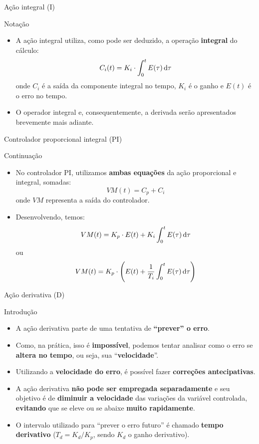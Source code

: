 \begin{frame}{Ação integral (I)}
	\begin{block}{Notação}
		\begin{itemize}
			\item A ação integral utiliza, como pode ser deduzido, a operação \textbf{integral} do cálculo:\[ C_i(t)=K_i\cdot\int_{0}^{t}E(\tau)\dif \tau \]
			onde $ C_i $ é a saída da componente integral no tempo, $ K_i $ é o ganho e $ E(t) $ é o erro no tempo.
			\item O operador integral e, consequentemente, a derivada serão apresentados brevemente mais adiante.
		\end{itemize}
	\end{block}
\end{frame}


\begin{frame}{Controlador proporcional integral (PI)}
	\begin{block}{Continuação}
		\begin{itemize}
			\item No controlador PI, utilizamos \textbf{ambas equações} da ação proporcional e integral, somadas:\[ VM(t)=C_p+C_i \]
			onde $ VM $ representa a saída do controlador.
			\item Desenvolvendo, temos:\[ VM(t)=K_p\cdot E(t) + K_i\int_{0}^{t}E(\tau) \dif \tau \]
			ou
			\[ VM(t)=K_p\cdot\left( E(t)+\dfrac{1}{T_i}\int_{0}^{t}E(\tau) \dif \tau \right) \]
		\end{itemize}
	\end{block}
\end{frame}


\begin{frame}{Ação derivativa (D)}
	\begin{block}{Introdução}
		\begin{itemize}
			\item A ação derivativa parte de uma tentativa de \textbf{``prever'' o erro}.
			\item Como, na prática, isso é \textbf{impossível}, podemos tentar analisar como o erro se \textbf{altera no tempo}, ou seja, sua ``\textbf{velocidade}''.
			\item Utilizando a \textbf{velocidade do erro}, é possível fazer \textbf{correções antecipativas}.
			\item A ação derivativa \textbf{não pode ser empregada separadamente} e seu objetivo é
			de \textbf{diminuir a velocidade} das variações da variável controlada, \textbf{evitando} que se eleve ou se abaixe \textbf{muito rapidamente}.
			\item O intervalo utilizado para ``prever o erro futuro'' é chamado \textbf{tempo derivativo} ($ T_d=K_d/K_p $, sendo $ K_d $ o ganho derivativo).
		\end{itemize}
	\end{block}
\end{frame}


